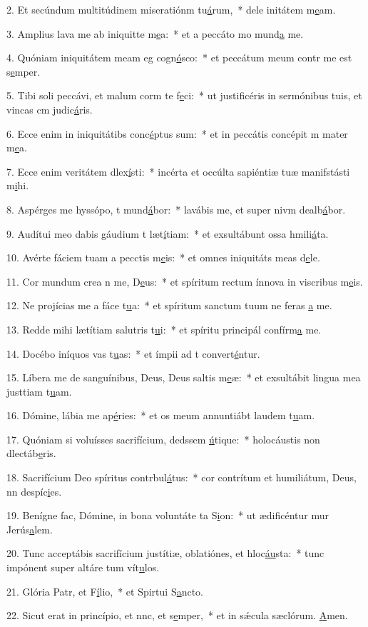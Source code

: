2. Et secúndum multitúdinem miseratiónm tu\uline{á}rum,~* dele initátem m\uline{e}am.\par 
3. Amplius lava me ab iniquitte m\uline{e}a:~* et a peccáto mo mund\uline{a} me.\par 
4. Quóniam iniquitátem meam eg cogn\uline{ó}sco:~* et peccátum meum contr me est s\uline{e}mper.\par 
5. Tibi soli peccávi, et malum corm te f\uline{e}ci:~* ut justificéris in sermónibus tuis, et vincas cm judic\uline{á}ris.\par 
6. Ecce enim in iniquitátibs conc\uline{é}ptus sum:~* et in peccátis concépit m mater m\uline{e}a.\par 
7. Ecce enim veritátem dlex\uline{í}sti:~* incérta et occúlta sapiéntiæ tuæ manifstásti m\uline{i}hi.\par 
8. Aspérges me hyssópo, t mund\uline{á}bor:~* lavábis me, et super nivm dealb\uline{á}bor.\par 
9. Audítui meo dabis gáudium t læt\uline{í}tiam:~* et exsultábunt ossa hmili\uline{á}ta.\par 
10. Avérte fáciem tuam a pecctis m\uline{e}is:~* et omnes iniquitáts meas d\uline{e}le.\par 
11. Cor mundum crea n me, D\uline{e}us:~* et spíritum rectum ínnova in viscribus m\uline{e}is.\par 
12. Ne projícias me a fáce t\uline{u}a:~* et spíritum sanctum tuum ne feras \uline{a} me.\par 
13. Redde mihi lætítiam salutris t\uline{u}i:~* et spíritu principál confírm\uline{a} me.\par 
14. Docébo iníquos vas t\uline{u}as:~* et ímpii ad t convert\uline{é}ntur.\par 
15. Líbera me de sanguínibus, Deus, Deus saltis m\uline{e}æ:~* et exsultábit lingua mea justtiam t\uline{u}am.\par 
16. Dómine, lábia me ap\uline{é}ries:~* et os meum annuntiábt laudem t\uline{u}am.\par 
17. Quóniam si voluísses sacrifícium, dedssem \uline{ú}tique:~* holocáustis non dlectáb\uline{e}ris.\par 
18. Sacrifícium Deo spíritus contrbul\uline{á}tus:~* cor contrítum et humiliátum, Deus, nn despíc\uline{i}es.\par 
19. Benígne fac, Dómine, in bona voluntáte ta S\uline{i}on:~* ut ædificéntur mur Jerús\uline{a}lem.\par 
20. Tunc acceptábis sacrifícium justítiæ, oblatiónes, et hloc\uline{áu}sta:~* tunc impónent super altáre tum vít\uline{u}los.\par 
21. Glória Patr, et F\uline{í}lio,~* et Spirtui S\uline{a}ncto.\par 
22. Sicut erat in princípio, et nnc, et s\uline{e}mper,~* et in sǽcula sæclórum. \uline{A}men.\par 
